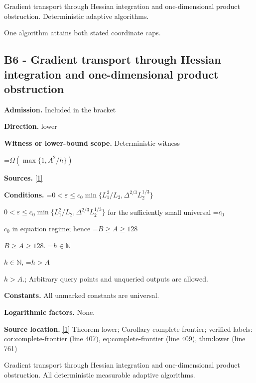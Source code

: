 \documentclass[10pt,a4paper]{article}
\newcommand{\AtlasMath}[1]{\par\begingroup\centering\setbox0=\hbox{$\displaystyle #1$}\ifdim\wd0>1.4\linewidth\typeout{ATLAS WIDE FORMULA: \the\wd0}\fi\ifdim\wd0>\linewidth\resizebox{\linewidth}{!}{\box0}\else\box0\fi\par\endgroup}
\newcommand{\AtlasInlineMath}[1]{\begingroup\setbox0=\hbox{$#1$}\ifdim\wd0>.4\linewidth\endgroup\AtlasMath{#1}\else\endgroup$#1$\fi}
\begin{document}
Gradient transport through Hessian integration and one-dimensional product obstruction. Deterministic adaptive algorithms.



One algorithm attains both stated coordinate caps.



\subsection{B6 - Gradient transport through Hessian integration and one-dimensional product obstruction}


\textbf{Admission.} Included in the bracket



\textbf{Direction.} lower



\textbf{Witness or lower-bound scope.} Deterministic witness



\AtlasMath{\Omega\!\left(\max\{1,A^2/h\}\right)}


\textbf{Sources.} \href{https://github.com/WU-Wendao/Colombo/blob/main/colombo_sensorium/Complexity_altas/data/sources/colombo/0904/manuscript.pdf}{[1]}



\textbf{Conditions.} \AtlasInlineMath{0<\varepsilon\le c_0\min\{L_1^2/L_2,\Delta^{2/3}L_2^{1/3}\}} for the sufficiently small universal \AtlasInlineMath{c_0} in equation regime; hence \AtlasInlineMath{B\ge A\ge128}. \AtlasInlineMath{h\in\mathbb N}, \AtlasInlineMath{h>A}.; Arbitrary query points and unqueried outputs are allowed.



\textbf{Constants.} All unmarked constants are universal.



\textbf{Logarithmic factors.} None.



\textbf{Source location.} \href{https://github.com/WU-Wendao/Colombo/blob/main/colombo_sensorium/Complexity_altas/data/sources/colombo/0904/manuscript.pdf}{[1]} Theorem lower; Corollary complete-frontier; verified labels: cor:complete-frontier (line 407), eq:complete-frontier (line 409), thm:lower (line 761)



Gradient transport through Hessian integration and one-dimensional product obstruction. All deterministic measurable adaptive algorithms.
\end{document}
